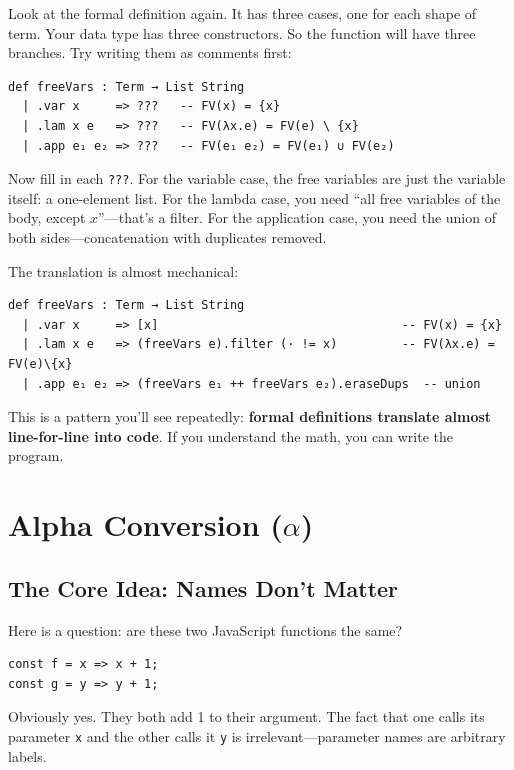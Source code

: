 \documentclass[11pt,a4paper]{article}
\theoremstyle{definition}
\begin{document}
Look at the formal definition again. It has three cases, one for each shape of
term. Your data type has three constructors. So the function will have three
branches. Try writing them as comments first:

\begin{verbatim}
def freeVars : Term → List String
  | .var x     => ???   -- FV(x) = {x}
  | .lam x e   => ???   -- FV(λx.e) = FV(e) \ {x}
  | .app e₁ e₂ => ???   -- FV(e₁ e₂) = FV(e₁) ∪ FV(e₂)
\end{verbatim}

Now fill in each \texttt{???}. For the variable case, the free variables are
just the variable itself: a one-element list. For the lambda case, you need
``all free variables of the body, except $x$''---that's a filter. For the
application case, you need the union of both sides---concatenation with
duplicates removed.

The translation is almost mechanical:

\begin{verbatim}
def freeVars : Term → List String
  | .var x     => [x]                                  -- FV(x) = {x}
  | .lam x e   => (freeVars e).filter (· != x)         -- FV(λx.e) = FV(e)\{x}
  | .app e₁ e₂ => (freeVars e₁ ++ freeVars e₂).eraseDups  -- union
\end{verbatim}

This is a pattern you'll see repeatedly: \textbf{formal definitions translate
almost line-for-line into code}. If you understand the math, you can write the
program.
\section{Alpha Conversion ($\alpha$)}\label{sec:alpha}

\subsection{The Core Idea: Names Don't Matter}

Here is a question: are these two JavaScript functions the same?

\begin{verbatim}
const f = x => x + 1;
const g = y => y + 1;
\end{verbatim}

Obviously yes. They both add 1 to their argument. The fact that one calls its
parameter \texttt{x} and the other calls it \texttt{y} is irrelevant---parameter
names are arbitrary labels.
\end{document}
